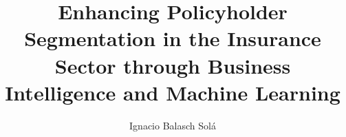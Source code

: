 
\title{Enhancing Policyholder Segmentation in the Insurance Sector through Business Intelligence and Machine Learning}

\author{Ignacio Balasch Solá}



\renewcommand{\degreedate}{January 2025}


\subject{Business Intelligence, Machine Learning, Insurance}







     






